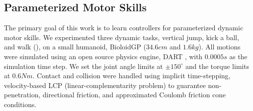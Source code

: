 


\subsection{Parameterized Motor Skills}


The primary goal of this work is to learn controllers for
parameterized dynamic motor skills.  We experimented three dynamic
tasks, vertical jump, kick a ball, and walk (), on a small
humanoid, BioloidGP \cite{BioloidGP:2014:URL} ($34.6cm$ and $1.6kg$).
All motions were simulated using an open source physics engine, DART
\cite{DART:2014:URL,Liu:2012:STM}, with $0.0005s$ as the simulation
time step. We set the joint angle limits at $\pm150^{\circ}$ and the
torque limits at $0.6Nm$. Contact and collision were handled using
implicit time-stepping, velocity-based LCP (linear-complementarity
problem) to guarantee non-penetration, directional friction, and
approximated Coulomb friction cone conditions.

